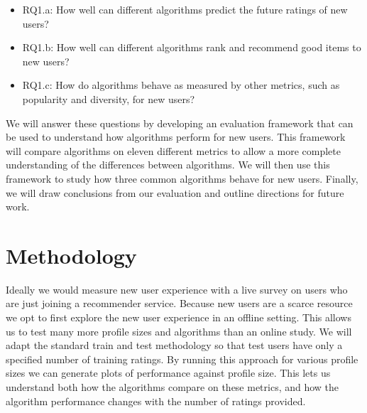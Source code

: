 \documentclass[letterpaper]{sig-alternate}
\begin{document}
      
  \begin{itemize}
  \item RQ1.a: How well can different algorithms predict the future ratings of new users?
  \item RQ1.b: How well can different algorithms rank and recommend good items to new users?
  \item RQ1.c: How do algorithms behave as measured by other metrics, such as popularity and diversity, for new users?
  \end{itemize}

  We will answer these questions by developing an evaluation framework that can be used to understand how algorithms perform for new users.
  This framework will compare algorithms on eleven different metrics to allow a more complete understanding of the differences between algorithms.
  We will then use this framework to study how three common algorithms behave for new users.
  Finally, we will draw conclusions from our evaluation and outline directions for future work.

\section{Methodology}
\label{sec:methodology}

  Ideally we would measure new user experience with a live survey on users who are just joining a recommender service.
  Because new users are a scarce resource we opt to first explore the new user experience in an offline setting.
  This allows us to test many more profile sizes and algorithms than an online study.
  We will adapt the standard train and test methodology so that test users have only a specified number of training ratings.
  By running this approach for various profile sizes we can generate plots of performance against profile size.
  This lets us understand both how the algorithms compare on these metrics, and how the algorithm performance changes with the number of ratings provided.
\end{document}
